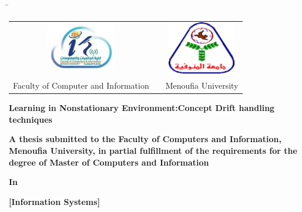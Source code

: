 

\begin{titlepage}
	\begin{tabbing}
		\hspace{1cm} %
		\= \kill %
		\begin{tabular}{ccc} %
			\includegraphics[width=3cm]{0_frontmatter/figures/PNG/faculty_image.png} & \hspace{2.5cm} & \includegraphics[width=3cm]{0_frontmatter/figures/PNG/menoufia_logo.png} \\
			\multicolumn{1}{l}{Faculty of Computer and Information}                  & \hspace{2.5cm} & \multicolumn{1}{l}{Menoufia  University}                                 \\
		\end{tabular}
	\end{tabbing}
	\begin{center}
		\vspace{0.5cm}

		\textbf{\Huge \normalfont Learning in Nonstationary Environment:Concept Drift handling techniques}
		\vspace{0.3cm}

		\textbf{\large \normalfont A thesis submitted to the Faculty of Computers and Information, Menoufia University, in partial fulfillment of the requirements for the degree of Master of Computers and Information} \\
		\vspace{0.2cm}

		\textbf{\large In} \\
		\vspace{0.2cm}

		\textbf{\Large [Information Systems]} \\
		\vspace{0.5cm}


\end{center}
\end{titlepage}
